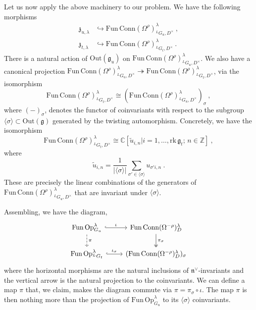 \documentclass[a4paper]{article}
\def\IC{\mathbb{C}}
\def\IZ{\mathbb{Z}}
\def\gf{\mathfrak{g}}
\def \zf{\mathfrak{z}}
\begin{document}
Let us now apply the above machinery to our problem. We have the following morphisms
\begin{equation}
	\begin{split}
	\zf_{u,\lambda} &\hookrightarrow \mathrm{Fun\, Conn}(\Omega^\rho)_{^LG_u,D^\times}^\lambda~,\\
	\zf_{t,\lambda} &\hookrightarrow \mathrm{Fun\, Conn}(\Omega^\rho)_{^LG_t,D^\times}^\lambda~.
	\end{split}
\end{equation}
There is a natural action of $\mathrm{Out}(\gf_u)$ on $\mathrm{Fun\, Conn}(\Omega^\rho)_{^LG_u,D^\times}^\lambda$. We also have a canonical projection $\mathrm{Fun\, Conn}(\Omega^\rho)_{^LG_u,D^\times}^\lambda\twoheadrightarrow \mathrm{Fun\, Conn}(\Omega^\rho)_{^LG_t,D^\times}^\lambda$, via the isomorphism
\begin{equation}
	\mathrm{Fun\, Conn}(\Omega^\rho)_{^LG_t,D^\times}^\lambda \cong (\mathrm{Fun\, Conn}(\Omega^\rho)_{^LG_u,D^\times}^\lambda)_\sigma~,
\end{equation}
where $(-)_\sigma$, denotes the functor of coinvariants with respect to the subgroup $\langle\sigma\rangle\subset\mathrm{Out}(\gf)$ generated by the twisting automorphism. Concretely, we have the isomorphism
\begin{equation}
	\mathrm{Fun\, Conn}(\Omega^\rho)_{^LG_t,D^\times}^\lambda \cong \IC\left[\tilde{u}_{i,n} | i=1,\dots,\mathrm{rk}\, \gf_t;\,n\in\IZ\right]~,
\end{equation}
where
\begin{equation}
	\tilde{u}_{i,n} = \frac{1}{|\langle\sigma\rangle|}\sum_{\sigma'\in\langle\sigma\rangle}u_{\sigma'{i},n}~.
\end{equation}
These are precisely the linear combinations of the generators of $\mathrm{Fun\, Conn}(\Omega^\rho)_{^LG_u,D^\times}^\lambda$ that are invariant under $\langle\sigma\rangle$.

Assembling, we have the diagram,
\begin{equation}
	\begin{tikzcd}
	\mathrm{Fun\, Op}_{G_u}^\lambda \arrow[hookrightarrow]{r}{\iota} \arrow[dashed,"\pi"]{d}& \mathrm{Fun\, Conn}(\Omega^{-\rho})^\lambda_D\arrow[twoheadrightarrow]{d}{\pi_\sigma} \\
	\mathrm{Fun\, Op}_{^LG_t}^\lambda \arrow[hookrightarrow]{r}{\iota_\sigma} & (\mathrm{Fun\, Conn}(\Omega^{-\rho})^\lambda_D)_\sigma
	\end{tikzcd}
\end{equation}
where the horizontal morphisms are the natural inclusions of $\mathfrak{n}^\vee$-invariants and the vertical arrow is the natural projection to the coinvariants. We can define a map $\pi$ that, we claim, makes the diagram commute via $\pi = \pi_\sigma\circ\iota$. The map $\pi$ is then nothing more than the projection of $\mathrm{Fun \, Op}^\lambda_{G_u}$ to its $\langle \sigma \rangle $ coinvariants.
\end{document}
